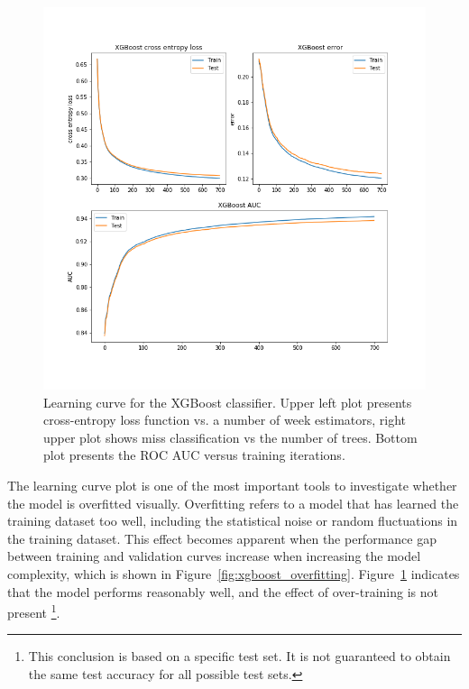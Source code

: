 \begin{figure}
\centering
\includegraphics{figures/learning_curve_xgboost.png}
\caption{Learning curve for the XGBoost classifier. Upper left plot presents cross-entropy loss function vs. a number of week estimators, right upper plot shows miss classification vs the number of trees. Bottom plot presents the ROC AUC versus training iterations.}
\label{fig:xgboost trainig}
\end{figure}


The learning curve plot is one of the most important tools to investigate whether the model is overfitted visually.  
Overfitting refers to a model that has learned the training dataset too well, including the statistical noise or random fluctuations in the training dataset. This effect becomes apparent when the performance gap between training and validation curves increase when increasing the model complexity, which is shown in Figure~\ref{fig:xgboost_overfitting}. Figure~\ref{fig:xgboost trainig} indicates that the model performs reasonably well, and the effect of over-training is not present \footnote{This conclusion is based on a specific test set. It is not guaranteed to obtain the same test accuracy for all possible test sets.}.


